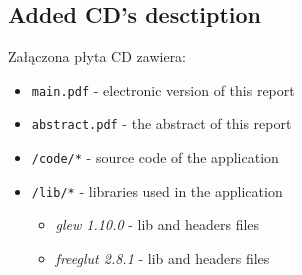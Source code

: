 
\begin{appendix}
\thispagestyle{empty}
\appendix

\chapter{Added CD's desctiption}
Załączona płyta CD zawiera:
\begin{itemize}
\item \texttt{main.pdf} - electronic version of this report
\item \texttt{abstract.pdf} - the abstract of this report
\item \texttt{/code/*} - source code of the application
\item \texttt{/lib/*} - libraries used in the application
\begin{itemize}
\item \emph{glew 1.10.0} - lib and headers files
\item \emph{freeglut 2.8.1 } - lib and headers files
\end{itemize}
\end{itemize}

\end{appendix}
